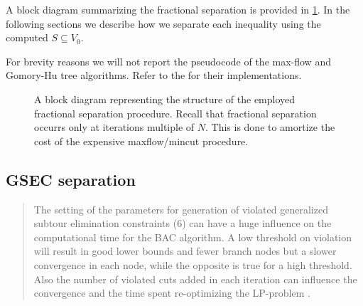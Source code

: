 A block diagram summarizing the fractional separation is provided in \cref{fig:fractional-separation-block-diagram}.
In the following sections we describe how we separate each inequality using the computed $S \subseteq V_0$.

For brevity reasons we will not report the pseudocode of the max-flow and Gomory-Hu tree algorithms.
Refer to the  for their implementations.

\begin{figure}[ht]
	\centering
	\caption{A block diagram representing the structure of the employed fractional separation procedure. Recall that fractional separation occurrs only at iterations multiple of $N$. This is done to amortize the cost of the expensive maxflow/mincut procedure.}
	\label{fig:fractional-separation-block-diagram}
\end{figure}

\subsection{GSEC separation}
\label{sec:impl-gsec-separation}

\begin{quote}
	The setting of the parameters for generation of violated generalized subtour elimination constraints
	(6) can have a huge influence on the computational time for the BAC algorithm. A low threshold on
	violation will result in good lower bounds and fewer branch nodes but a slower convergence in each
	node, while the opposite is true for a high threshold. Also the number of violated cuts added in each
	iteration can influence the convergence and the time spent re-optimizing the LP-problem \cite{jepsen2008branchandcut}.
\end{quote}


